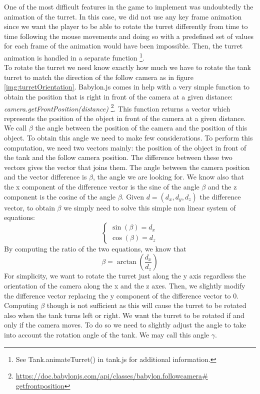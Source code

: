 \documentclass[14pt]{article}
\begin{document}
One of the most difficult features in the game to implement was undoubtedly the animation of the turret. In this case, we did not use any key frame animation since we want the player to be able to rotate the turret differently from time to time following the mouse movements and doing so with a predefined set of values for each frame of the animation would have been impossible. Then, the turret animation is handled in a separate function \footnote{See Tank.animateTurret() in tank.js for additional information.}.\\
To rotate the turret we need know exactly how much we have to rotate the tank turret to match the direction of the follow camera as in figure \ref{img:turretOrientation}. Babylon.js comes in help with a very simple function to obtain the position that is right in front of the camera at a given distance: \textit{camera.getFrontPosition(distance)} \footnote{\url{https://doc.babylonjs.com/api/classes/babylon.followcamera\# getfrontposition}}. This function returns a vector which represents the position of the object in front of the camera at a given distance. We call \(\beta\) the angle between the position of the camera and the position of this object. To obtain this angle we need to make few considerations.
To perform this computation, we need two vectors mainly: the position of the object in front of the tank and the follow camera position. The difference between these two vectors gives the vector that joins them. The angle between the camera position and the vector difference is \(\beta\), the angle we are looking for. We know also that the x component of the difference vector is the sine of the angle \(\beta\) and the z component is the cosine of the angle \(\beta\). Given \(d= (d_{x},d_{y},d_{z})\) the difference vector, to obtain \(\beta\) we simply need to solve this simple non linear system of equations:
\begin{equation}\label{eq:animateTurret}
\begin{cases}
\sin(\beta) = d_{x}\\
\cos(\beta) = d_{z}
\end{cases}
\end{equation}
By computing the ratio of the two equations, we know that 
\begin{equation}\label{eq:beta}
\beta = \arctan\left(\frac{d_{x}}{d_{z}}\right)
\end{equation}
For simplicity, we want to rotate the turret just along the y axis regardless the orientation of the camera along the x and the z axes. Then, we slightly modify the difference vector replacing the y component of the difference vector to 0. Computing \(\beta\) though is not sufficient as this will cause the turret to be rotated also when the tank turns left or right. We want the turret to be rotated if and only if the camera moves. To do so we need to slightly adjust the angle to take into account the rotation angle of the tank. We may call this angle \(\gamma\).
\end{document}
